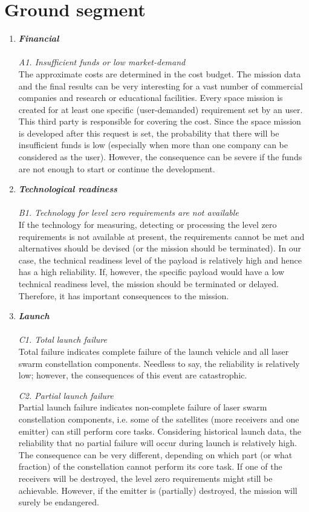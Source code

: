 \section{Ground segment}
\label{blTRAGs}
\begin{enumerate}[A]
	\item  \textbf{\textit{Financial}} \\\\
\textit{A1. Insufficient funds or low market-demand}\\
The approximate costs are determined in the cost budget. The mission data and the final results can be very interesting for a vast number of commercial companies and research or educational facilities. Every space mission is created for at least one specific (user-demanded) requirement set by an user. This third party is responsible for covering the cost. Since the space mission is developed after this request is set, the probability that there will be insufficient funds is low (especially when more than one company can be considered as the user). However, the consequence can be severe if the funds are not enough to start or continue the development. 

	\item  \textbf{\textit{Technological readiness}} \\\\
\textit{B1. Technology for level zero requirements are not available}\\
If the technology for measuring, detecting or processing the level zero requirements is 	not available at present, the requirements cannot be met and alternatives should be devised (or the mission should be terminated). In our case, the technical readiness level of the 	payload is relatively high and hence has a high reliability. If, however, the specific 	payload would have a low technical readiness level, the mission should be terminated or 	delayed. Therefore, it has important consequences to the mission.

	\item  \textbf{\textit{Launch}} \\\\
\textit{C1. Total launch failure}\\
Total failure indicates complete failure of the launch vehicle and all laser swarm 	constellation components. Needless to say, the reliability is relatively low; however, the consequences of this event are catastrophic.

\textit{C2. Partial launch failure}\\
Partial launch failure indicates non-complete failure of laser swarm constellation components, i.e. some of the satellites (more receivers and one emitter) can still perform core tasks. Considering historical launch data, the reliability that no partial failure will occur during launch is relatively high. The consequence can be very different, depending on which part (or what fraction) of the constellation cannot perform its core task. If one of the receivers will be destroyed, the level zero requirements might still be achievable. However, if the emitter is (partially) destroyed, the mission will surely be endangered. 


\end{enumerate}
